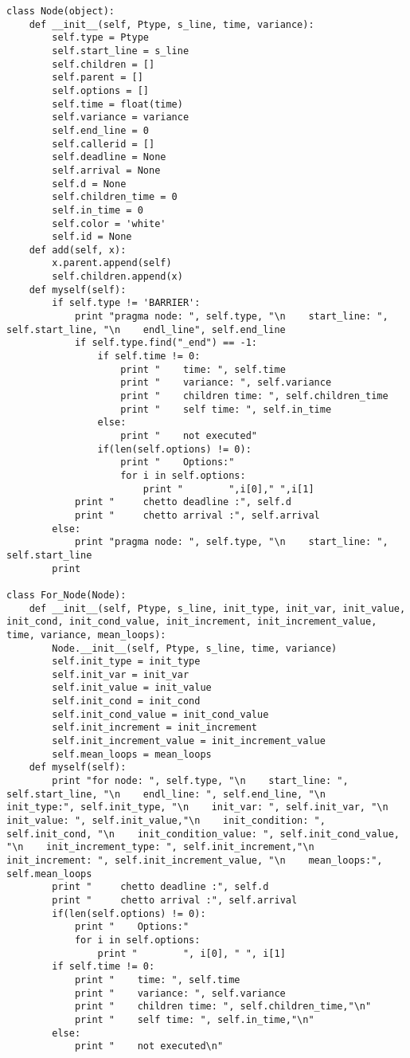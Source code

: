 \documentclass[a4paper,10pt,twoside]{book}
\begin{document}
\begin{lstlisting}[language=CCC, caption=pargraph.py]
class Node(object):
    def __init__(self, Ptype, s_line, time, variance):
        self.type = Ptype
        self.start_line = s_line
        self.children = []
        self.parent = []
        self.options = []
        self.time = float(time)
        self.variance = variance
        self.end_line = 0
        self.callerid = []
        self.deadline = None
        self.arrival = None
        self.d = None
        self.children_time = 0
        self.in_time = 0
        self.color = 'white'
        self.id = None
    def add(self, x):	
    	x.parent.append(self)
    	self.children.append(x)
    def myself(self):
		if self.type != 'BARRIER':
			print "pragma node: ", self.type, "\n    start_line: ", self.start_line, "\n    endl_line", self.end_line
			if self.type.find("_end") == -1:
				if self.time != 0:
					print "    time: ", self.time
					print "    variance: ", self.variance
					print "    children time: ", self.children_time
					print "    self time: ", self.in_time
				else:
					print "    not executed"
				if(len(self.options) != 0):
					print "    Options:"
					for i in self.options:
						print "        ",i[0]," ",i[1]
			print "     chetto deadline :", self.d
			print "     chetto arrival :", self.arrival
		else:
			print "pragma node: ", self.type, "\n    start_line: ", self.start_line
		print

class For_Node(Node): 
    def __init__(self, Ptype, s_line, init_type, init_var, init_value, init_cond, init_cond_value, init_increment, init_increment_value, time, variance, mean_loops):
        Node.__init__(self, Ptype, s_line, time, variance)
        self.init_type = init_type
        self.init_var = init_var
        self.init_value = init_value
        self.init_cond = init_cond
        self.init_cond_value = init_cond_value
        self.init_increment = init_increment
        self.init_increment_value = init_increment_value
        self.mean_loops = mean_loops
    def myself(self):
		print "for node: ", self.type, "\n    start_line: ", self.start_line, "\n    endl_line: ", self.end_line, "\n    init_type:", self.init_type, "\n    init_var: ", self.init_var, "\n    init_value: ", self.init_value,"\n    init_condition: ", self.init_cond, "\n    init_condition_value: ", self.init_cond_value, "\n    init_increment_type: ", self.init_increment,"\n    init_increment: ", self.init_increment_value, "\n    mean_loops:", self.mean_loops
		print "     chetto deadline :", self.d
		print "     chetto arrival :", self.arrival
		if(len(self.options) != 0):
			print "    Options:"
			for i in self.options:
				print "        ", i[0], " ", i[1]
		if self.time != 0:
			print "    time: ", self.time
			print "    variance: ", self.variance
			print "    children time: ", self.children_time,"\n"
			print "    self time: ", self.in_time,"\n"
		else:
			print "    not executed\n"


\end{lstlisting}
\end{document}
